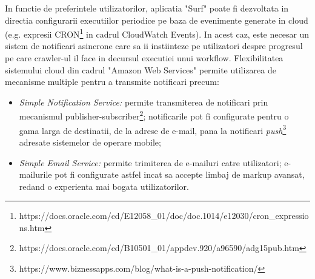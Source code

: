 In functie de preferintele utilizatorilor, aplicatia "Surf" poate fi dezvoltata in directia configurarii executiilor periodice pe baza de evenimente generate in cloud (e.g. expresii CRON\footnote{https://docs.oracle.com/cd/E12058\_01/doc/doc.1014/e12030/cron\_expressions.htm} in cadrul CloudWatch Events). In acest caz, este necesar un sistem de notificari asincrone care sa ii instiinteze pe utilizatori despre progresul pe care crawler-ul il face in decursul executiei unui workflow. Flexibilitatea sistemului cloud din cadrul "Amazon Web Services" permite utilizarea de mecanisme multiple pentru a transmite notificari precum:

\begin{itemize}

	\item{\textit{Simple Notification Service:} permite transmiterea de notificari prin mecanismul publisher-subscriber\footnote{https://docs.oracle.com/cd/B10501\_01/appdev.920/a96590/adg15pub.htm}; notificarile pot fi configurate pentru o gama larga de destinatii, de la adrese de e-mail, pana la notificari \textit{push}\footnote{https://www.biznessapps.com/blog/what-is-a-push-notification/} adresate sistemelor de operare mobile;}
	
	\item{\textit{Simple Email Service:} permite trimiterea de e-mailuri catre utilizatori; e-mailurile pot fi configurate astfel incat sa accepte limbaj de markup avansat, redand o experienta mai bogata utilizatorilor.}
	
\end{itemize}

